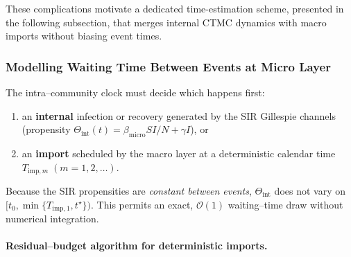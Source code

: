\documentclass[
]{ceurart}
\begin{document}
These complications motivate a dedicated time-estimation scheme,
presented in the following subsection, that merges internal CTMC
dynamics with macro imports without biasing event times.

\subsubsection{Modelling Waiting Time Between Events at Micro Layer}
\label{subsubsec:micro_waiting_time}

The intra–community clock must decide which happens first:

\begin{enumerate}\setlength{\itemsep}{2pt}
  \item an \textbf{internal} infection or recovery generated by the
        SIR Gillespie channels (propensity
        $\Theta_{\text{int}}(t)=\beta_{\text{micro}}SI/N+\gamma I$), or
  \item an \textbf{import} scheduled by the macro layer
        at a deterministic calendar time
        $T_{\mathrm{imp},m}\;(m=1,2,\dots)$.
\end{enumerate}

Because the SIR propensities are \emph{constant between events},
$\Theta_{\text{int}}$ does not vary on
$\bigl[t_0,\min\{T_{\mathrm{imp},1},t^\star\}\bigr)$.  
This permits an exact, \(\mathcal O(1)\) waiting–time draw without
numerical integration.

\paragraph{Residual–budget algorithm for deterministic imports.}
\end{document}
